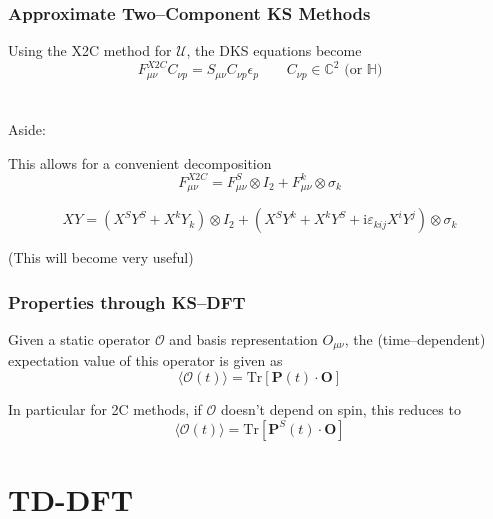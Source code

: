 \documentclass{beamer}
\newcommand{\bpar}[1]{\left( #1 \right)}                  %
\begin{document}
\begin{frame}
\frametitle{Approximate Two--Component KS Methods}

Using the X2C method for $\mathcal{U}$, the DKS equations become
\begin{equation*}
F^{X2C}_{\mu\nu} C_{\nu p} = S_{\mu\nu} C_{\nu p} \epsilon_p \qquad C_{\nu p} \in \mathbb{C}^2 \text{ (or }\mathbb{H})
\end{equation*}
~\\
~\\
Aside: 

This allows for a convenient decomposition
\begin{equation*}
F_{\mu\nu}^{X2C} = F_{\mu\nu}^S \otimes I_2 + F_{\mu\nu}^k \otimes \sigma_k
\end{equation*}


\begin{equation*}
XY = \bpar{X^SY^S + X^kY_k} \otimes I_2 + \bpar{X^S Y^k + X^k Y^S + \mathrm{i}\varepsilon_{kij}X^iY^j}\otimes \sigma_k
\end{equation*}
\begin{center} (This will become very useful) \end{center}
\end{frame}

\begin{frame}
\frametitle{Properties through KS--DFT}

Given a static operator $\mathcal{O}$ and basis representation $O_{\mu\nu}$, the (time--dependent) expectation value
of this operator is given as
\begin{equation*}
\langle \mathcal{O}(t) \rangle = \mathrm{Tr}[\mathbf{P}(t)\cdot\mathbf{O}]
\end{equation*}

In particular for 2C methods, if $\mathcal{O}$ doesn't depend on spin, this reduces to
\begin{equation*}
\langle \mathcal{O}(t) \rangle = \mathrm{Tr}[\mathbf{P}^S(t)\cdot\mathbf{O}]
\end{equation*}

\end{frame}

\section{TD-DFT}
\end{document}
